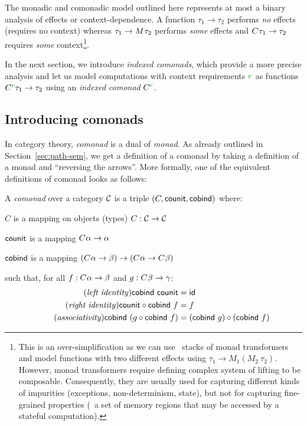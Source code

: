 The monadic and comonadic model outlined here represents at most a binary analysis of effects or 
context-dependence. A function $\tau_1 \rightarrow \tau_2$ performs \emph{no} effects (requires no 
context) whereas $\tau_1 \rightarrow M^{}\tau_2$ performs \emph{some} effects and
$C^{}\tau_1 \rightarrow \tau_2$ requires \emph{some} context\footnote{This is an 
over-simplification as we can use \eg~stacks of monad transformers and model functions with
two different effects using $\tau_1 \rightarrow M_1(M_2~\tau_2)$. However, monad transformers 
require defining complex system of lifting to be composable. Consequently, they are usually used
for capturing different kinds of impurities (exceptions, non-determinism, state), but not for
capturing fine-grained properties (\eg~a set of memory regions that may be accessed by a
stateful computation).}. 

In the next section, we introduce \emph{indexed comonads}, which provide a more precise analysis 
and let us model computations with context requirements $\cclrd{r}$ as functions 
$\ctyp{\cclrd{r}}{\tau_1} \rightarrow \tau_2$ using an \emph{indexed comonad} $\ctyp{\cclrd{r}}{}$.


\subsection{Introducing comonads}

In category theory, \emph{comonad} is a dual of \emph{monad}. As already outlined in 
Section~\ref{sec:path-sem}, we get a definition of a comonad by taking a definition of a monad 
and ``reversing the arrows''. More formally, one of the equivalent definitions of comonad 
looks as follows:

\begin{definition}
A \emph{comonad} over a category $\mathcal{C}$ is a triple $(C, \textnormal{\sffamily counit}, \textnormal{\sffamily cobind})$ where:
\begin{compactitem}
\item $C$ is a mapping on objects (types) $C : \mathcal{C} \rightarrow \mathcal{C}$
\item $\textnormal{\sffamily counit}$ is a mapping $C^{}\alpha \rightarrow \alpha$ 
\item $\textnormal{\sffamily cobind}$ is a mapping $(C^{}\alpha \rightarrow \beta) 
  \rightarrow (C^{}\alpha \rightarrow C^{}\beta)$
\end{compactitem}
such that, for all $f:C^{}\alpha \rightarrow \beta$ and $g:C^{}\beta \rightarrow \gamma$:
\begin{align}
\tag{\emph{left identity}}
  \ident{cobind}~\ident{counit} &= \idf{}
  \\
\tag{\emph{right identity}}
  \ident{counit} \circ \ident{cobind}~f &= f
  \\
\tag{\emph{associativity}}
  \ident{cobind}~(g \circ \ident{cobind}~f) &= (\ident{cobind}~g) \circ (\ident{cobind}~f)
\end{align}
\end{definition}

